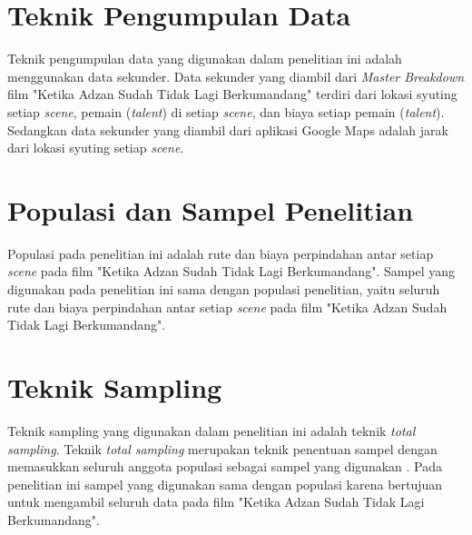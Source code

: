 \section{Teknik Pengumpulan Data}
\vspace{-4mm}
{\frenchspacing
    Teknik pengumpulan data yang digunakan dalam penelitian ini adalah menggunakan data sekunder.
    Data sekunder yang diambil dari \textit{Master Breakdown} film "Ketika Adzan Sudah Tidak Lagi Berkumandang" terdiri dari lokasi syuting setiap \textit{scene}, pemain (\textit{talent}) di setiap \textit{scene},
    dan biaya setiap pemain (\textit{talent}).
    Sedangkan data sekunder yang diambil dari aplikasi Google Maps adalah jarak dari lokasi syuting setiap \textit{scene}.
}
\vspace{-3mm}

\section{Populasi dan Sampel Penelitian}
\vspace{-4mm}
{\frenchspacing
    Populasi pada penelitian ini adalah rute dan biaya perpindahan antar setiap \textit{scene} pada film "Ketika Adzan Sudah Tidak Lagi Berkumandang".
    Sampel yang digunakan pada penelitian ini sama dengan populasi penelitian, yaitu seluruh rute dan biaya perpindahan antar setiap \textit{scene} pada film "Ketika Adzan Sudah Tidak Lagi Berkumandang".
}
\vspace{-3mm}

\section{Teknik Sampling}
\vspace{-4mm}
{\frenchspacing
    Teknik sampling yang digunakan dalam penelitian ini adalah teknik \textit{total sampling}.
    Teknik \textit{total sampling} merupakan teknik penentuan sampel dengan memasukkan seluruh anggota populasi sebagai sampel yang digunakan .
    Pada penelitian ini sampel yang digunakan sama dengan populasi karena bertujuan untuk mengambil seluruh data pada film "Ketika Adzan Sudah Tidak Lagi Berkumandang".
}
\vspace{-3mm}

